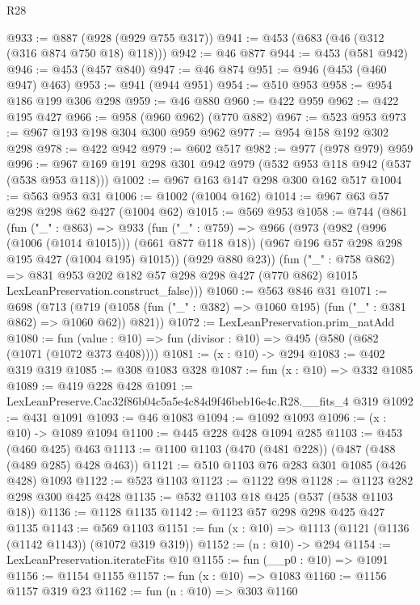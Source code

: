 \begin{lexlean}{R28}
\begin{coremodule}
@933 := @887 (@928 (@929 @755 @317))
@941 := @453 (@683 (@46 (@312 (@316 @874 @750 @18) @118)))
@942 := @46 @877
@944 := @453 (@581 @942)
@946 := @453 (@457 @840)
@947 := @46 @874
@951 := @946 (@453 (@460 @947) @463)
@953 := @941 (@944 @951)
@954 := @510 @953
@958 := @954 @186 @199 @306 @298
@959 := @46 @880
@960 := @422 @959
@962 := @422 @195 @427
@966 := @958 (@960 @962) (@770 @882)
@967 := @523 @953
@973 := @967 @193 @198 @304 @300 @959 @962
@977 := @954 @158 @192 @302 @298
@978 := @422 @942
@979 := @602 @517
@982 := @977 (@978 @979) @959
@996 := @967 @169 @191 @298 @301 @942 @979 (@532 @953 @118 @942 (@537 (@538 @953 @118)))
@1002 := @967 @163 @147 @298 @300 @162 @517
@1004 := @563 @953 @31
@1006 := @1002 (@1004 @162)
@1014 := @967 @63 @57 @298 @298 @62 @427 (@1004 @62)
@1015 := @569 @953
@1058 := @744
    (@861
      (fun ("_" : @863) =>
      @933
        (fun ("_" : @759) =>
        @966
          (@973
            (@982 (@996 (@1006 (@1014 @1015))) (@661 @877 @118 @18))
            (@967 @196 @57 @298 @298 @195 @427 (@1004 @195) @1015))
          (@929 @880 @23))
        (fun ("_" : @758 @862) =>
        @831
          @953
          @202
          @182
          @57
          @298
          @298
          @427
          (@770 @862)
          @1015
          LexLeanPreservation.construct_false)))
@1060 := @563 @846 @31
@1071 := @698
    (@713 (@719 (@1058 (fun ("_" : @382) => @1060 @195) (fun ("_" : @381 @862) => @1060 @62)) @821))
@1072 := LexLeanPreservation.prim_natAdd
@1080 := fun (value : @10) => fun (divisor : @10) => @495 (@580 (@682 (@1071 (@1072 @373 @408))))
@1081 := (x : @10) -> @294
@1083 := @402 @319 @319
@1085 := @308 @1083 @328
@1087 := fun (x : @10) => @332 @1085
@1089 := @419 @228 @428
@1091 := LexLeanPreserve.Cac32f86b04c5a5e4c84d9f46beb16e4c.R28.__fits_4 @319
@1092 := @431 @1091
@1093 := @46 @1083
@1094 := @1092 @1093
@1096 := (x : @10) -> @1089 @1094
@1100 := @445 @228 @428 @1094 @285
@1103 := @453 (@460 @425) @463
@1113 := @1100 @1103 (@470 (@481 @228)) (@487 (@488 (@489 @285) @428 @463))
@1121 := @510 @1103 @76 @283 @301 @1085 (@426 @428) @1093
@1122 := @523 @1103
@1123 := @1122 @98
@1128 := @1123 @282 @298 @300 @425 @428
@1135 := @532 @1103 @18 @425 (@537 (@538 @1103 @18))
@1136 := @1128 @1135
@1142 := @1123 @57 @298 @298 @425 @427 @1135
@1143 := @569 @1103
@1151 := fun (x : @10) => @1113 (@1121 (@1136 (@1142 @1143)) (@1072 @319 @319))
@1152 := (n : @10) -> @294
@1154 := LexLeanPreservation.iterateFits @10
@1155 := fun (__p0 : @10) => @1091
@1156 := @1154 @1155
@1157 := fun (x : @10) => @1083
@1160 := @1156 @1157 @319 @23
@1162 := fun (n : @10) => @303 @1160

\end{coremodule}
\end{lexlean}
